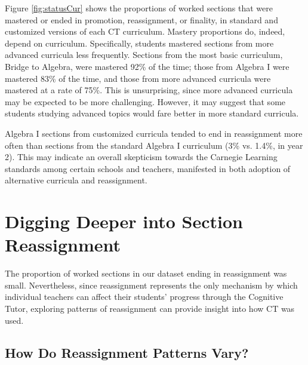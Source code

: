 \documentclass[notitlepage,12pt]{jedm}\usepackage[]{graphicx}\usepackage[]{color}
\begin{document}
Figure \ref{fig:statusCur} shows the proportions of worked sections
that were mastered or ended in promotion, reassignment, or finality, in
standard and customized versions of each CT curriculum.
Mastery proportions do, indeed, depend on curriculum.
Specifically, students mastered sections from more advanced curricula
less frequently.
Sections from the most basic curriculum, Bridge to Algebra, were
mastered
92\%
of the time;
those from Algebra I were mastered
83\%
of the time, and those from more advanced curricula were mastered
at a rate of
75\%.
This is unsurprising, since more advanced curricula may be expected
to be more challenging.
However, it may suggest that some students studying advanced topics
would fare better in more standard curricula.

Algebra I sections from customized curricula tended to end in
reassignment more often than sections from the standard Algebra I
curriculum (3\% vs.
1.4\%, in year 2).
This may indicate an overall skepticism towards the Carnegie Learning standards
among certain schools and teachers, manifested in both adoption of
alternative curricula and reassignment.%


\section{Digging Deeper into Section Reassignment}\label{sec:cp}
The proportion of worked sections in our dataset ending in
reassignment was small.
Nevertheless, since reassignment represents the only mechanism by
which individual teachers can affect their students' progress through
the Cognitive Tutor, exploring patterns of reassignment can provide
insight into how CT was used.



\subsection{How Do Reassignment Patterns Vary?}
\end{document}
